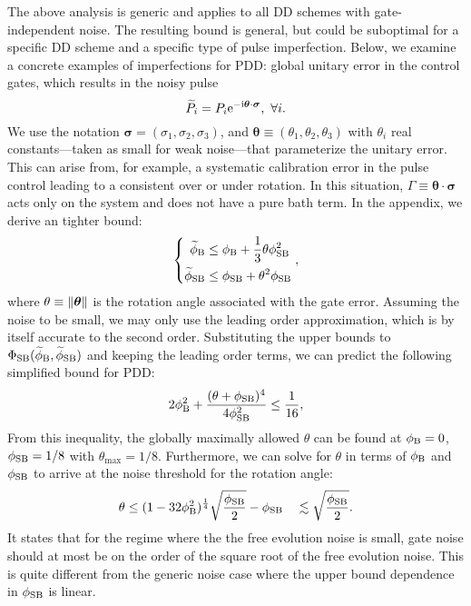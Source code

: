 \documentclass[pra,reprint,superscriptaddress]{revtex4-2}
\newcommand{\wt}[1]{\widetilde{#1}}
\begin{document}
The above analysis is generic and applies to all DD schemes with gate-independent noise. 
The resulting bound is general, but could be suboptimal for a specific DD scheme and a specific type of pulse imperfection. Below, we examine a concrete examples of imperfections  for PDD: 
global unitary error in the control gates,  which results in the noisy pulse 
\begin{equation}
\widetilde P_i=P_i\mathrm{e}^{-\mathrm{i} \bm{\theta}\cdot\bm\sigma},\ \forall i.
\end{equation}
We use the notation $\bm\sigma=(\sigma_1,\sigma_2,\sigma_3)$, and $\bm\theta\equiv (\theta_1,\theta_2,\theta_3)$ with $\theta_i$ real constants---taken as small for weak noise---that parameterize the unitary error.  This can arise from, for example, a systematic calibration error in the pulse control leading to a consistent over or under rotation. In this situation, $\Gamma\equiv \bm\theta\cdot\bm\sigma$ acts only on the system and does not have a pure bath term. In the appendix, we derive an tighter bound:
\begin{equation}\label{eq:eff-Hami-tcp}
\left\{
\begin{aligned}
\widetilde{\phi}_{\mathrm{B}} &\le \phi_{\mathrm{B}} + \frac{1}{3}\theta  \phi^2_{\mathrm{SB}}  \\
\widetilde{\phi}_{\mathrm{SB}} &\le \phi_{\mathrm{SB}} +  \theta^2  \phi_{\mathrm{SB}}  \\
\end{aligned}    \right.,
\end{equation}
where $\theta \equiv \Vert {\bm \theta} \Vert$ is the rotation angle associated with the gate error.
Assuming the noise to be small, we may only use the leading order 
approximation, which is by itself accurate to the second order. 
Substituting the upper bounds to  $\Phi_\rSB(\wt\phi_\rB,\wt\phi_\rSB)$ and keeping the leading order terms,  we can predict the following simplified bound for PDD:
\begin{equation}\label{eq:npdd-bound-simple}
2\phi_{\mathrm{B}}^2 + \frac{(\theta+\phi_{\mathrm{SB}})^4}{4\phi_{\mathrm{SB}}^2}\le \frac{1}{16},
\end{equation}
From this inequality, the globally maximally allowed $\theta$ can be found at $\phi_{\mathrm{B}}=0$, $\phi_{\mathrm{SB}}=1/8$ with
$\theta_\mathrm{max}= 1/8$. Furthermore, we can solve for $\theta$ in terms of $\phi_{\mathrm{B}}$ and $\phi_{\mathrm{SB}}$ to arrive at the noise threshold for the rotation angle:
\begin{equation}\label{eq:npdd-err-thres}
    \theta \le (1-32\phi_{\mathrm{B}} ^2)^{\frac{1}{4}} \sqrt{\frac{\phi_{\mathrm{SB}}}{2} }-\phi_{\mathrm{SB}}
    \quad \lesssim \sqrt{\frac{\phi_{\mathrm{SB}}}{2}}.
\end{equation}
It states that for the regime where the the free evolution noise is small, gate noise should at most be on the order of the square root of the free evolution noise. This  is quite different from the generic noise case where the upper bound dependence in $\phi_{\mathrm{SB}}$ is linear. 
\end{document}
